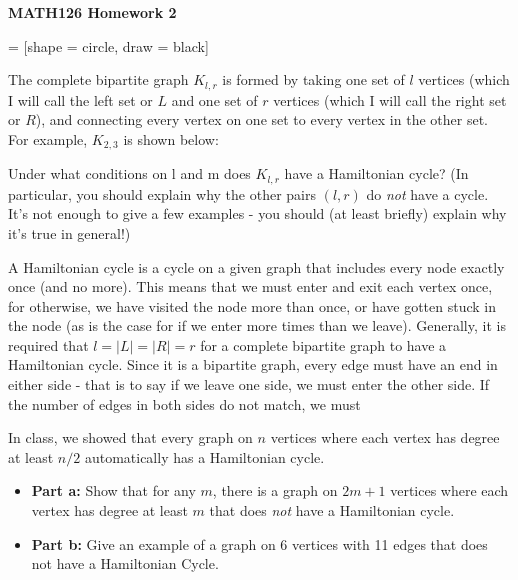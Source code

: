 \documentclass{article}
\begin{document}
\centerline{\large \bf MATH126 Homework 2}

\vskip 0.15in

 = [shape = circle, draw = black]
\begin{problem} The complete bipartite graph $K_{l,r}$ is formed by taking one set of $l$ vertices (which I will call the left set or $L$ and one set of $r$ vertices (which I will call the right set or $R$), and connecting every vertex on one set to every vertex in the other set.  For example, $K_{2,3}$ is shown below:
\vskip 0.15in \noindent
{}
\vskip 0.15in \noindent
Under what conditions on l and m does $K_{l,r}$ have a Hamiltonian cycle? (In particular, you should explain why the other pairs $(l,r)$ do \emph{not} have a cycle. It's not enough to give a few examples - you should (at least briefly) explain why it's true in general!)
\end{problem}

\begin{solution} A Hamiltonian cycle is a cycle on a given graph that includes every node exactly once (and no more).  This means that we must enter and exit each vertex once, for otherwise, we have visited the node more than once, or have gotten stuck in the node (as is the case for if we enter more times than we leave).  Generally, it is required that $l=|L|=|R|=r$ for a complete bipartite graph to have a Hamiltonian cycle.  Since it is a bipartite graph, every edge must have an end in either side - that is to say if we leave one side, we must enter the other side.  If the number of edges in both sides do not match, we must 
\end{solution}


\begin{problem} In class, we showed that every graph on $n$ vertices where each vertex has degree at least $n/2$ automatically has a Hamiltonian cycle.
\begin{itemize}
	\item[]{\textbf{Part a:}} Show that for any $m$, there is a graph on $2m+1$ vertices where each vertex has degree at least $m$ that does \emph{not} have a Hamiltonian cycle.
	\item[]{\textbf{Part b:}} Give an example of a graph on 6 vertices with 11 edges that does not have a Hamiltonian Cycle.
\end{itemize}
\end{problem}
\end{document}
